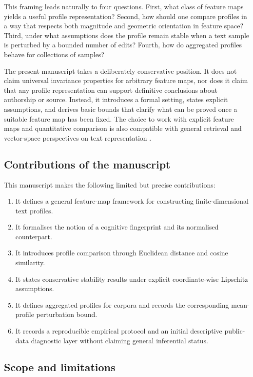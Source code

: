 \documentclass[11pt]{article}
\begin{document}
This framing leads naturally to four questions. First, what class of feature maps yields a useful profile representation? Second, how should one compare profiles in a way that respects both magnitude and geometric orientation in feature space? Third, under what assumptions does the profile remain stable when a text sample is perturbed by a bounded number of edits? Fourth, how do aggregated profiles behave for collections of samples?

The present manuscript takes a deliberately conservative position. It does not claim universal invariance properties for arbitrary feature maps, nor does it claim that any profile representation can support definitive conclusions about authorship or source. Instead, it introduces a formal setting, states explicit assumptions, and derives basic bounds that clarify what can be proved once a suitable feature map has been fixed. The choice to work with explicit feature maps and quantitative comparison is also compatible with general retrieval and vector-space perspectives on text representation \cite{ManningEtAl2008}.

\subsection{Contributions of the manuscript}

This manuscript makes the following limited but precise contributions:
\begin{enumerate}[label=\arabic*.]
    \item It defines a general feature-map framework for constructing finite-dimensional text profiles.
    \item It formalises the notion of a cognitive fingerprint and its normalised counterpart.
    \item It introduces profile comparison through Euclidean distance and cosine similarity.
    \item It states conservative stability results under explicit coordinate-wise Lipschitz assumptions.
    \item It defines aggregated profiles for corpora and records the corresponding mean-profile perturbation bound.
    \item It records a reproducible empirical protocol and an initial descriptive public-data diagnostic layer without claiming general inferential status.
\end{enumerate}

\subsection{Scope and limitations}
\end{document}
